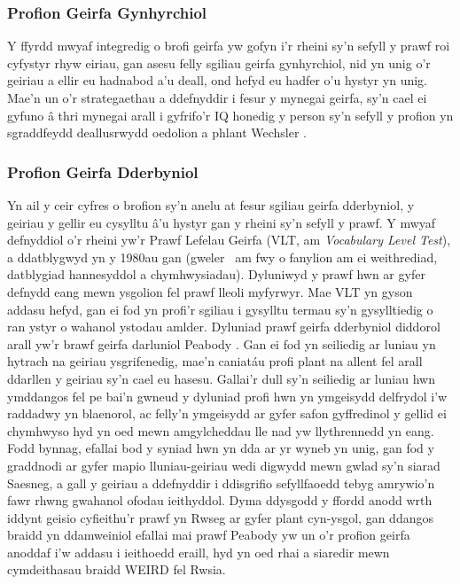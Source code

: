 \subsubsection{Profion Geirfa Gynhyrchiol}
Y ffyrdd mwyaf integredig o brofi geirfa yw gofyn i'r rheini sy'n sefyll y prawf roi cyfystyr rhyw eiriau, gan asesu felly sgiliau geirfa gynhyrchiol, nid yn unig o'r geiriau a ellir eu hadnabod a'u deall, ond hefyd eu hadfer o'u hystyr yn unig. Mae'n un o'r strategaethau a ddefnyddir i fesur y mynegai geirfa, sy'n cael ei gyfuno â thri mynegai arall i gyfrifo'r IQ honedig y person sy'n sefyll y profion yn sgraddfeydd deallusrwydd oedolion a phlant Wechsler \parencite{wechsler_wechsler_nodate}.

\subsubsection{Profion Geirfa Dderbyniol}
Yn ail y ceir cyfres o brofion sy'n anelu at fesur sgiliau geirfa dderbyniol, y geiriau y gellir eu cysylltu â'u hystyr gan y rheini sy'n sefyll y prawf. Y mwyaf defnyddiol o'r rheini yw'r Prawf Lefelau Geirfa (VLT, am \textit{Vocabulary Level Test}), a ddatblygwyd yn y 1980au gan \textcite{nation_teaching_1990} (gweler~\cite{kremmel_vocabulary_2017} am fwy o fanylion am ei weithrediad, datblygiad hannesyddol a chymhwysiadau). Dyluniwyd y prawf hwn ar gyfer defnydd eang mewn ysgolion fel prawf lleoli  myfyrwyr. Mae VLT yn gyson addasu hefyd, gan ei fod yn profi'r sgiliau i gysylltu termau sy'n gysylltiedig o ran ystyr o wahanol ystodau amlder. Dyluniad prawf geirfa dderbyniol diddorol arall yw'r brawf geirfa darluniol Peabody \parencite{dunn_ppvt-4_nodate}. Gan ei fod yn seiliedig ar luniau yn hytrach na geiriau ysgrifenedig, mae'n caniatáu profi plant na allent fel arall ddarllen y geiriau sy'n cael eu hasesu. Gallai'r dull sy'n seiliedig ar luniau hwn ymddangos fel pe bai'n gwneud y dyluniad profi hwn yn ymgeisydd delfrydol i'w raddadwy yn blaenorol, ac felly'n ymgeisydd ar gyfer safon gyffredinol y gellid ei chymhwyso hyd yn oed mewn amgylcheddau lle nad yw llythrennedd yn eang. Fodd bynnag, efallai bod y syniad hwn yn dda ar yr wyneb yn unig, gan fod y graddnodi ar gyfer mapio lluniau-geiriau wedi digwydd mewn gwlad sy'n siarad Saesneg, a gall y geiriau a ddefnyddir i ddisgrifio sefyllfaoedd tebyg amrywio'n fawr rhwng gwahanol ofodau ieithyddol. Dyma ddysgodd \textcite{kartushina_use_2022} y ffordd anodd wrth iddynt geisio cyfieithu'r prawf yn Rwseg ar gyfer plant cyn-ysgol, gan ddangos braidd yn ddamweiniol efallai mai prawf Peabody yw un o'r profion geirfa anoddaf i'w addasu i ieithoedd eraill, hyd yn oed rhai a siaredir mewn cymdeithasau braidd WEIRD fel Rwsia.

